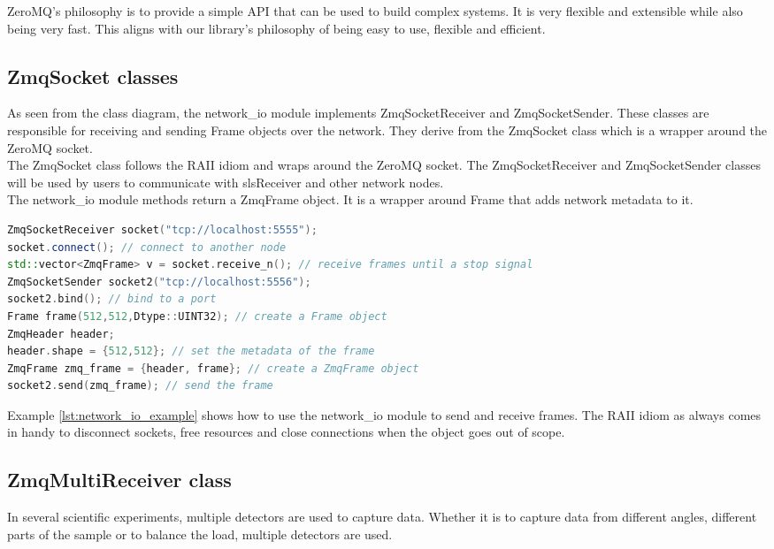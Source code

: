 \begin{spacing}{1.2}
    ZeroMQ's philosophy is to provide a simple API that can be used to build complex systems.
    It is very flexible and extensible while also being very fast. This aligns with our library's
    philosophy of being easy to use, flexible and efficient.\\

    \subsection{ZmqSocket classes}
    As seen from the class diagram, the network\_io module implements ZmqSocketReceiver and ZmqSocketSender.
    These classes are responsible for receiving and sending Frame objects over the network. They
    derive from the ZmqSocket class which is a wrapper around the ZeroMQ socket.\\

    The ZmqSocket class follows the RAII idiom and wraps around the ZeroMQ socket. The ZmqSocketReceiver
    and ZmqSocketSender classes will be used by users to communicate with slsReceiver and
    other network nodes.\\

    The network\_io module methods return a ZmqFrame object. It is a wrapper around Frame that adds
    network metadata to it.\\

    \begin{lstlisting}[language=C++, caption=Example of using the network\_io module, label=lst:network_io_example]
ZmqSocketReceiver socket("tcp://localhost:5555"); 
socket.connect(); // connect to another node
std::vector<ZmqFrame> v = socket.receive_n(); // receive frames until a stop signal
ZmqSocketSender socket2("tcp://localhost:5556");
socket2.bind(); // bind to a port
Frame frame(512,512,Dtype::UINT32); // create a Frame object
ZmqHeader header;
header.shape = {512,512}; // set the metadata of the frame
ZmqFrame zmq_frame = {header, frame}; // create a ZmqFrame object
socket2.send(zmq_frame); // send the frame
\end{lstlisting}


    Example \ref{lst:network_io_example} shows how to use the network\_io module to send and receive frames.
    The RAII idiom as always comes in handy to disconnect sockets, free resources and close connections when the
    object goes out of scope.\\


    \subsection{ZmqMultiReceiver class}
    In several scientific experiments, multiple detectors are used to capture data. Whether
    it is to capture data from different angles, different parts of the sample or to balance
    the load, multiple detectors are used.\\


\end{spacing}
